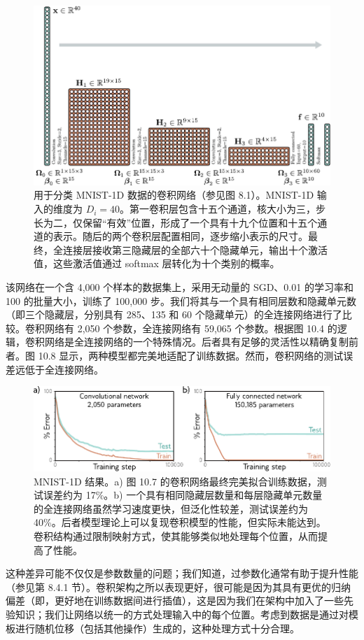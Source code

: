 \documentclass[lang=cn,newtx,10pt,scheme=chinese]{elegantbook}
\begin{document}
\begin{figure}[ht!]
	\centering
	\includegraphics[width=0.7\linewidth]{PDFFigures/UDLChap10PDF/ConvDrawMNIST1D.pdf}
	\caption{用于分类 MNIST-1D 数据的卷积网络（参见图 8.1）。MNIST-1D 输入的维度为 \(D_i = 40\)。第一卷积层包含十五个通道，核大小为三，步长为二，仅保留“有效”位置，形成了一个具有十九个位置和十五个通道的表示。随后的两个卷积层配置相同，逐步缩小表示的尺寸。最终，全连接层接收第三隐藏层的全部六十个隐藏单元，输出十个激活值，这些激活值通过 softmax 层转化为十个类别的概率。}
\end{figure}


该网络在一个含 4,000 个样本的数据集上，采用无动量的 SGD、0.01 的学习率和 100 的批量大小，训练了 100,000 步。我们将其与一个具有相同层数和隐藏单元数（即三个隐藏层，分别具有 285、135 和 60 个隐藏单元）的全连接网络进行了比较。卷积网络有 2,050 个参数，全连接网络有 59,065 个参数。根据图 10.4 的逻辑，卷积网络是全连接网络的一个特殊情况。后者具有足够的灵活性以精确复制前者。图 10.8 显示，两种模型都完美地适配了训练数据。然而，卷积网络的测试误差远低于全连接网络。


\begin{figure}[ht!]
	\centering
	\includegraphics[width=0.7\linewidth]{PDFFigures/UDLChap10PDF/ConvMNIST1D.pdf}
	\caption{MNIST-1D 结果。a) 图 10.7 的卷积网络最终完美拟合训练数据，测试误差约为 17\%。b) 一个具有相同隐藏层数量和每层隐藏单元数量的全连接网络虽然学习速度更快，但泛化性较差，测试误差约为 40\%。后者模型理论上可以复现卷积模型的性能，但实际未能达到。卷积结构通过限制映射方式，使其能够类似地处理每个位置，从而提高了性能。}
\end{figure}


这种差异可能不仅仅是参数数量的问题；我们知道，过参数化通常有助于提升性能（参见第 8.4.1 节）。卷积架构之所以表现更好，很可能是因为其具有更优的归纳偏差（即，更好地在训练数据间进行插值），这是因为我们在架构中加入了一些先验知识；我们让网络以统一的方式处理输入中的每个位置。考虑到数据是通过对模板进行随机位移（包括其他操作）生成的，这种处理方式十分合理。
\end{document}
